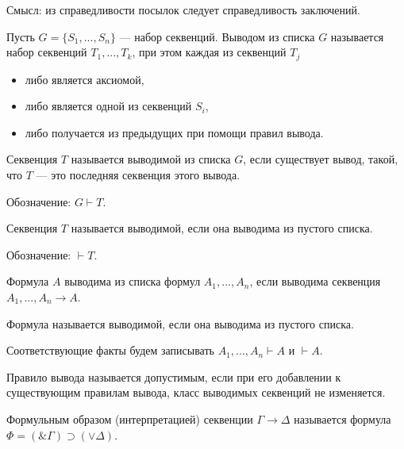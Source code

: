    \begin{Rem}
        Смысл: из справедливости посылок следует справедливость заключений.
    \end{Rem}

    \begin{Def}[Вывод]
        Пусть $G = \{ S_1, ..., S_n\}$ --- набор секвенций. Выводом из списка $G$ называется набор секвенций $T_1, ..., T_k$, при этом каждая из секвенций $T_j$
        \begin{itemize}
            \item либо является аксиомой,
            \item либо является одной из секвенций $S_i$,
            \item либо получается из предыдущих при помощи правил вывода.
        \end{itemize}
    \end{Def}

    \begin{Def}
        Секвенция $T$ называется выводимой из списка $G$, если существует вывод, такой, что $T$ --- это последняя секвенция этого вывода. 

        Обозначение: $G \vdash T$.

        Секвенция $T$ называется выводимой, если она выводима из пустого списка.

        Обозначение: $\vdash T$.
    \end{Def}

    \begin{Def}
        Формула $A$ выводима из списка формул $A_1, ..., A_n$, если выводима секвенция $A_1, ..., A_n \rightarrow A$.
        
        Формула называется выводимой, если она выводима из пустого списка.
        
        Соответствующие факты будем записывать $A_1, ..., A_n \vdash A$ и $\vdash A$.
    \end{Def}
    
    \begin{Def}
        Правило вывода называется допустимым, если при его добавлении к существующим правилам вывода, класс выводимых секвенций не изменяется.
    \end{Def}

    \begin{Def}
        Формульным образом (интерпретацией) секвенции $\Gamma \rightarrow \Delta$ называется формула $\Phi = (\& \Gamma) \supset (\vee \Delta)$.
    \end{Def}
    
